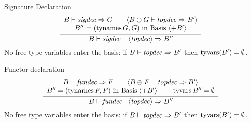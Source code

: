 \begin{inference-rule}{Signature Declaration}
\begin{equation}\label{rule:static-modules:sigdectopdec}
\vcenter{\infer{\B\ts\sigdecintopdec\ra \B''}
  {\begin{array}{c}
      \B\ts\sigdec\ra \G\qquad \optional{\B\oplus\G\ts\topdec\ra\B'}\\
      \B'' = (\TyNamesFcn\G,G)\ \In\ \Basis\;\langle + \B'\rangle
\end{array}}}
\end{equation}
No free type variables enter the  basis: if $B\vdash\textit{topdec\/}\Rightarrow B'$
then $\mathop{\rm tyvars}\nolimits(B') = \emptyset$.
\end{inference-rule}

\begin{inference-rule}{Functor declaration}
\begin{equation}\label{rule:static-modules:fundectopdec}
\vcenter{\infer{\B\ts\fundecintopdec\ra\B''}
  {\begin{array}{c}
      \B\ts\fundec\ra\F\qquad\optional{\B\oplus\F\ts\topdec\ra\B'}\\
      B'' = (\TyNamesFcn\F,\F)\ \In\ \Basis\; \optional{+\B'}\qquad \TyVarsFcn\B''=\emptyset
      \end{array}}}
\end{equation}
No free type variables enter the  basis: if $B\vdash\textit{topdec\/}\Rightarrow B'$
then $\mathop{\rm tyvars}\nolimits(B') = \emptyset$.
\end{inference-rule}

